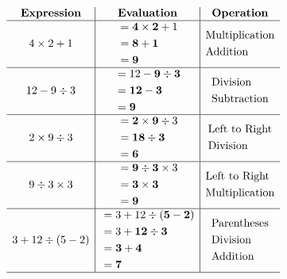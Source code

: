 \[
\begin{array}{c|c|c}
\textbf{Expression} & \textbf{Evaluation} & \textbf{Operation} \\ \hline

4 \times 2 + 1 &
\begin{aligned}
&= \mathbf{4 \times 2} + 1 \\
&= \mathbf{8 + 1} \\
&= \mathbf{9}
\end{aligned}
&
\begin{aligned}
&\text{Multiplication} \\
&\text{Addition}
\end{aligned}
\\ \hline

12 - 9 \div 3 &
\begin{aligned}
&= 12 - \mathbf{9 \div 3} \\
&= \mathbf{12 - 3} \\
&= \mathbf{9}
\end{aligned}
&
\begin{aligned}
&\text{Division} \\
&\text{Subtraction}
\end{aligned}
\\ \hline

2 \times 9 \div 3 &
\begin{aligned}
&= \mathbf{2 \times 9} \div 3 \\
&= \mathbf{18 \div 3} \\
&= \mathbf{6}
\end{aligned}
&
\begin{aligned}
&\text{Left to Right} \\
&\text{Division}
\end{aligned}
\\ \hline

9 \div 3 \times 3 &
\begin{aligned}
&= \mathbf{9 \div 3} \times 3 \\
&= \mathbf{3 \times 3} \\
&= \mathbf{9}
\end{aligned}
&
\begin{aligned}
&\text{Left to Right} \\
&\text{Multiplication}
\end{aligned}
\\ \hline

3 + 12 \div (5 - 2) &
\begin{aligned}
&= 3 + 12 \div \mathbf{(5 - 2)} \\
&= 3 + \mathbf{12 \div 3} \\
&= \mathbf{3 + 4} \\
&= \mathbf{7}
\end{aligned}
&
\begin{aligned}
&\text{Parentheses} \\
&\text{Division} \\
&\text{Addition}
\end{aligned}
\\ \hline


\end{array}\]
